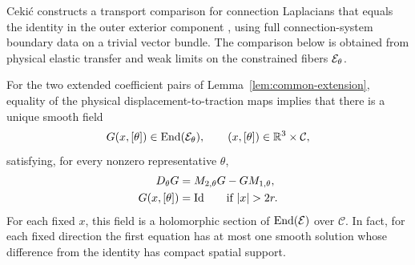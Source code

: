 Ceki\'c constructs a transport comparison for connection Laplacians
that equals the identity in the outer exterior component
\cite[Theorem~3.4 in the arXiv version]{Cekic2025}, using full
connection-system boundary data on a trivial vector bundle. The comparison
below is obtained from physical elastic transfer and weak limits on the
constrained fibers $\mathcal E_\theta$.

\begin{proposition}\label{prop:transport-matching}
For the two extended coefficient pairs of
Lemma~\ref{lem:common-extension}, equality of the physical
displacement-to-traction maps implies that there is a unique smooth
field
\[
 G(x,[\theta])\in\operatorname{End}(\mathcal E_\theta),
 \qquad (x,[\theta])\in\mathbb R^3\times\mathcal C,
\]
satisfying, for every nonzero representative $\theta$,
\begin{equation}\label{eq:comparison-transport}
 \begin{aligned}
 D_\theta G&=M_{2,\theta}G-GM_{1,\theta},\\
 G(x,[\theta])&=\Id\qquad\text{if }|x|>2r.
 \end{aligned}
\end{equation}
For each fixed $x$, this field is a holomorphic section of
$\operatorname{End}(\mathcal E)$ over $\mathcal C$. In fact, for each
fixed direction the first equation has at most one smooth solution whose
difference from the identity has compact spatial support.
\end{proposition}

